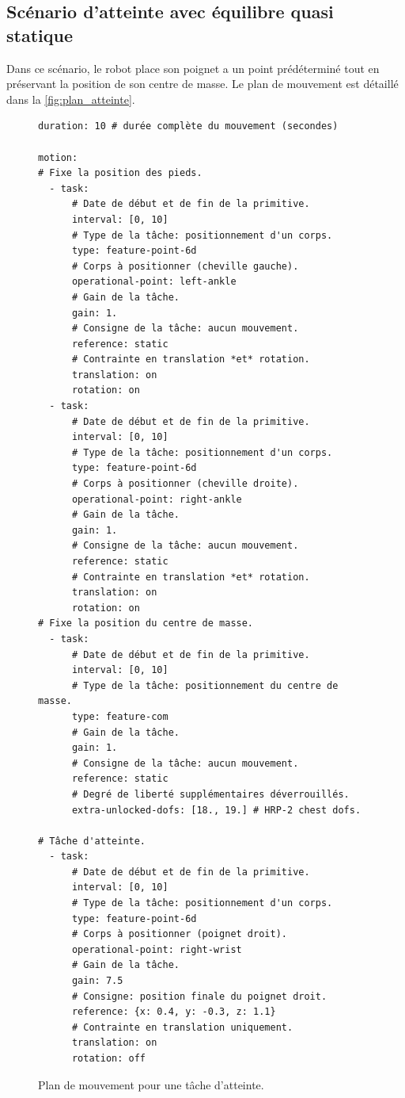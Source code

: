 \FloatBarrier

\subsection{Scénario d'atteinte avec équilibre quasi statique}

Dans ce scénario, le robot place son poignet a un point prédéterminé
tout en préservant la position de son centre de masse. Le plan de
mouvement est détaillé dans la \autoref{fig:plan_atteinte}.

\begin{figure}
  \footnotesize
  \begin{center}
\begin{verbatim}
duration: 10 # durée complète du mouvement (secondes)

motion:
# Fixe la position des pieds.
  - task:
      # Date de début et de fin de la primitive.
      interval: [0, 10]
      # Type de la tâche: positionnement d'un corps.
      type: feature-point-6d
      # Corps à positionner (cheville gauche).
      operational-point: left-ankle
      # Gain de la tâche.
      gain: 1.
      # Consigne de la tâche: aucun mouvement.
      reference: static
      # Contrainte en translation *et* rotation.
      translation: on
      rotation: on
  - task:
      # Date de début et de fin de la primitive.
      interval: [0, 10]
      # Type de la tâche: positionnement d'un corps.
      type: feature-point-6d
      # Corps à positionner (cheville droite).
      operational-point: right-ankle
      # Gain de la tâche.
      gain: 1.
      # Consigne de la tâche: aucun mouvement.
      reference: static
      # Contrainte en translation *et* rotation.
      translation: on
      rotation: on
# Fixe la position du centre de masse.
  - task:
      # Date de début et de fin de la primitive.
      interval: [0, 10]
      # Type de la tâche: positionnement du centre de masse.
      type: feature-com
      # Gain de la tâche.
      gain: 1.
      # Consigne de la tâche: aucun mouvement.
      reference: static
      # Degré de liberté supplémentaires déverrouillés.
      extra-unlocked-dofs: [18., 19.] # HRP-2 chest dofs.

# Tâche d'atteinte.
  - task:
      # Date de début et de fin de la primitive.
      interval: [0, 10]
      # Type de la tâche: positionnement d'un corps.
      type: feature-point-6d
      # Corps à positionner (poignet droit).
      operational-point: right-wrist
      # Gain de la tâche.
      gain: 7.5
      # Consigne: position finale du poignet droit.
      reference: {x: 0.4, y: -0.3, z: 1.1}
      # Contrainte en translation uniquement.
      translation: on
      rotation: off
\end{verbatim}
  \end{center}
  \caption{Plan de mouvement pour une tâche d'atteinte.\label{fig:plan_atteinte}}
\end{figure}


